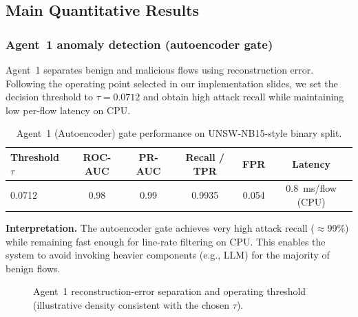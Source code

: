 \subsection{Main Quantitative Results}
\label{sec:main-results}

\subsubsection{Agent~1 anomaly detection (autoencoder gate)}
Agent~1 separates benign and malicious flows using reconstruction error. Following the operating point selected in our implementation slides, we set the decision threshold to $\tau=0.0712$ and obtain high attack recall while maintaining low per-flow latency on CPU.

\begin{table}[t]
\caption{Agent~1 (Autoencoder) gate performance on UNSW-NB15-style binary split.}
\label{tab:agent1_main}
\centering
\begin{tabular}{lccccc}
\toprule
\textbf{Threshold $\tau$} & \textbf{ROC-AUC} & \textbf{PR-AUC} & \textbf{Recall / TPR} & \textbf{FPR} & \textbf{Latency}\\
\midrule
0.0712 & 0.98 & 0.99 & 0.9935 & 0.054 & \SI{0.8}{\milli\second}/flow (CPU)\\
\bottomrule
\end{tabular}
\end{table}

\textbf{Interpretation.} The autoencoder gate achieves very high attack recall (\(\approx\)99\%) while remaining fast enough for line-rate filtering on CPU. This enables the system to avoid invoking heavier components (e.g., LLM) for the majority of benign flows.

\begin{figure}[t]
\centering
{}
\caption{Agent~1 reconstruction-error separation and operating threshold (illustrative density consistent with the chosen $\tau$).}
\label{fig:recon_dist}
\end{figure}

